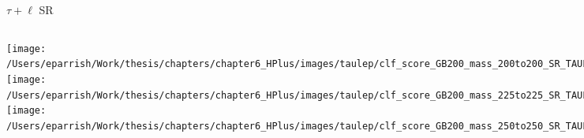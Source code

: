 \documentclass[aspectratio=169,xcolor=table]{beamer}
\begin{document}
    \begin{frame}[t]{$\tau+\ell$ SR}
      \begin{columns}[t]
          \texttt{[image: /Users/eparrish/Work/thesis/chapters/chapter6\_HPlus/images/taulep/clf\_score\_GB200\_mass\_200to200\_SR\_TAULEP.png]}
          \texttt{[image: /Users/eparrish/Work/thesis/chapters/chapter6\_HPlus/images/taulep/clf\_score\_GB200\_mass\_225to225\_SR\_TAULEP.png]}
          \texttt{[image: /Users/eparrish/Work/thesis/chapters/chapter6\_HPlus/images/taulep/clf\_score\_GB200\_mass\_250to250\_SR\_TAULEP.png]}

          \texttt{[image: /Users/eparrish/Work/thesis/chapters/chapter6\_HPlus/images/taulep/clf\_score\_GB200\_mass\_275to275\_SR\_TAULEP.png]}
          \texttt{[image: /Users/eparrish/Work/thesis/chapters/chapter6\_HPlus/images/taulep/clf\_score\_GB200\_mass\_300to300\_SR\_TAULEP.png]}
          \texttt{[image: /Users/eparrish/Work/thesis/chapters/chapter6\_HPlus/images/taulep/clf\_score\_GB200\_mass\_350to350\_SR\_TAULEP.png]}

          \texttt{[image: /Users/eparrish/Work/thesis/chapters/chapter6\_HPlus/images/taulep/clf\_score\_GB200\_mass\_400to400\_SR\_TAULEP.png]}
          \texttt{[image: /Users/eparrish/Work/thesis/chapters/chapter6\_HPlus/images/taulep/clf\_score\_GB200\_mass\_500to500\_SR\_TAULEP.png]}
          \texttt{[image: /Users/eparrish/Work/thesis/chapters/chapter6\_HPlus/images/taulep/clf\_score\_GB200\_mass\_600to600\_SR\_TAULEP.png]}

          \texttt{[image: /Users/eparrish/Work/thesis/chapters/chapter6\_HPlus/images/taulep/clf\_score\_GB200\_mass\_700to700\_SR\_TAULEP.png]}
          \texttt{[image: /Users/eparrish/Work/thesis/chapters/chapter6\_HPlus/images/taulep/clf\_score\_GB200\_mass\_800to800\_SR\_TAULEP.png]}
          \texttt{[image: /Users/eparrish/Work/thesis/chapters/chapter6\_HPlus/images/taulep/clf\_score\_GB200\_mass\_900to900\_SR\_TAULEP.png]}

      \end{columns}
    \end{frame}
\end{document}
